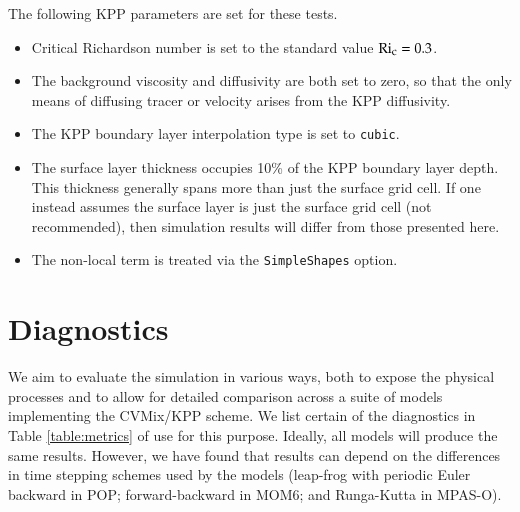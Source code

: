 The following KPP parameters are set for these tests. 
\begin{itemize}

\item Critical Richardson number is set to the standard value $\mbox{Ri}_{\mbox{\footnotesize c}} = 0.3$.

\item The background viscosity and diffusivity are both set to zero,
  so that the only means of diffusing tracer or velocity arises from
  the KPP diffusivity.

\item The KPP boundary layer interpolation type is set to {\tt cubic}.

\item The surface layer thickness occupies 10\% of the KPP boundary
  layer depth.  This thickness generally spans more than just the
  surface grid cell.  If one instead assumes the surface layer is just
  the surface grid cell (not recommended), then simulation results
  will differ from those presented here.

\item The non-local term is treated via the {\tt SimpleShapes} option.

\end{itemize}


\section{Diagnostics}

We aim to evaluate the simulation in various ways, both to expose the
physical processes and to allow for detailed comparison across a suite
of models implementing the CVMix/KPP scheme.  We list certain of the
diagnostics in Table \ref{table:metrics} of use for this purpose.
Ideally, all models will produce the same results.  However, we have
found that results can depend on the differences in time stepping
schemes used by the models (leap-frog with periodic Euler backward in
POP; forward-backward in MOM6; and Runga-Kutta in MPAS-O).  

